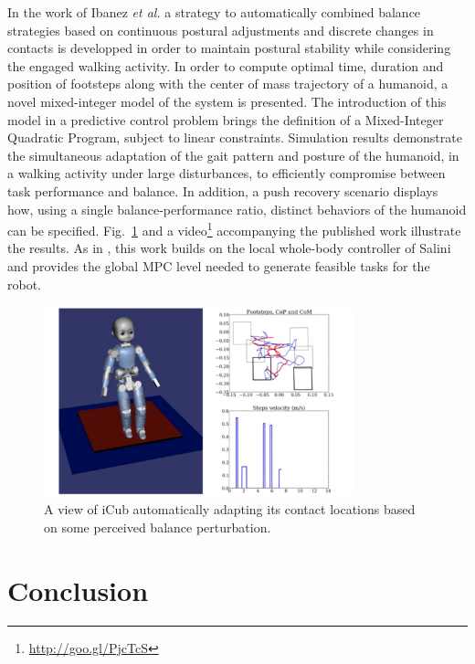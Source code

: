 \documentclass[12pt,a4paper,twoside]{article}
\begin{document}
In the work of Ibanez \textit{et al.} \cite{ibanez-IROS2014} a strategy to automatically combined balance strategies based on continuous postural adjustments and discrete changes in contacts is developped in order to maintain postural stability while considering the engaged walking activity. In order to compute optimal time, duration and position of footsteps along with the center of mass trajectory of a humanoid, a novel mixed-integer model of the system is presented. The introduction of this model in a predictive control problem brings the definition of a Mixed-Integer Quadratic Program, subject to linear constraints. Simulation results demonstrate the simultaneous adaptation of the gait pattern and posture of the humanoid, in a walking activity under large disturbances, to efficiently compromise between task performance and balance. In addition, a push recovery scenario displays how, using a single balance-performance ratio, distinct behaviors of the humanoid can be specified. Fig.~\ref{fig:ibanez_iros14} and a video\footnote{\url{http://goo.gl/PjcTcS}} accompanying the published work illustrate the results. As in \cite{ibanez-ICRA2014}, this work builds on the local whole-body controller of Salini and provides the global MPC level needed to generate feasible tasks for the robot.

    \begin{figure}[h!]
      \centering
      \includegraphics[width=0.8\textwidth]{figure/ibanez_iros14}
      \caption{A view of iCub automatically adapting its contact locations based on some perceived balance perturbation.}
      \label{fig:ibanez_iros14}
   \end{figure}

\newpage{}
\section{Conclusion}
\end{document}

